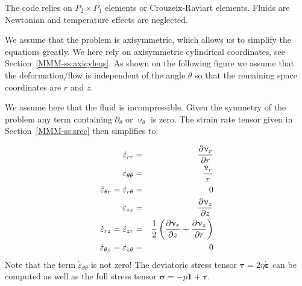 The code relies on $P_2\times P_1$ elements or Crouzeix-Raviart elements. Fluids are Newtonian and 
temperature effects are neglected. 

We assume that the problem is axisymmetric, which allows us to simplify the equations greatly. 
We here rely on axisymmetric cylindrical coordinates, see Section~\ref{MMM-ss:axicyleqs}.
As shown on the following figure we assume that the deformation/flow is independent of the angle 
$\theta$ so that the remaining space coordinates are $r$ and $z$.
\begin{center}

\end{center}


We assume here that the fluid is incompressible.
Given the symmetry of the problem any term containing $\partial_\theta$ or $\upnu_\theta$ is zero.
The strain rate tensor given in Section~\ref{MMM-ss:srcc} then simplifies to:

\begin{eqnarray}
\dot\varepsilon_{rr} 
&=& \frac{\partial \upnu_r}{\partial r} \nonumber\\
\dot\varepsilon_{\theta\theta}  &=& \frac{\upnu_r}{r} \nonumber\\
\dot\varepsilon_{\theta r} = \dot\varepsilon_{r\theta}  &=& 0 \nonumber\\
\dot\varepsilon_{zz} &=& \frac{\partial \upnu_z}{\partial z} \nonumber\\
\dot{\varepsilon}_{rz} = \dot{\varepsilon}_{zr} 
&=& \frac{1}{2}\left( \frac{\partial \upnu_r}{\partial z} + \frac{\partial \upnu_z}{\partial r} \right) \nonumber\\
\dot{\varepsilon}_{\theta z} = \dot{\varepsilon}_{z \theta} &=& 0 \nonumber
\end{eqnarray}
Note that the term $\dot\varepsilon_{\theta\theta} $ is not zero!
The deviatoric stress tensor ${\bm \tau}=2\eta \dot{\bm \varepsilon}$ can be computed
as well as the full stress tensor ${\bm \sigma}=-p {\bm 1} + {\bm \tau}$. 


